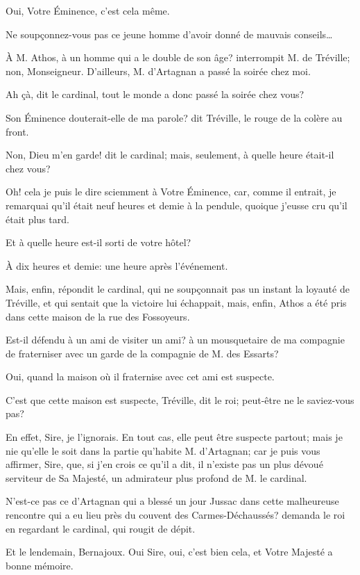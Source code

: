 \speak  Oui, Votre Éminence, c'est cela même. 

\speak  Ne soupçonnez-vous pas ce jeune homme d'avoir donné de mauvais conseils\dots 

\speak  À M. Athos, à un homme qui a le double de son âge? interrompit M. de Tréville; non, Monseigneur. D'ailleurs, M. d'Artagnan a passé la soirée chez moi. 

\speak  Ah çà, dit le cardinal, tout le monde a donc passé la soirée chez vous? 

\speak  Son Éminence douterait-elle de ma parole? dit Tréville, le rouge de la colère au front. 

\speak  Non, Dieu m'en garde! dit le cardinal; mais, seulement, à quelle heure était-il chez vous? 

\speak  Oh! cela je puis le dire sciemment à Votre Éminence, car, comme il entrait, je remarquai qu'il était neuf heures et demie à la pendule, quoique j'eusse cru qu'il était plus tard. 

\speak  Et à quelle heure est-il sorti de votre hôtel? 

\speak  À dix heures et demie: une heure après l'événement. 

\speak  Mais, enfin, répondit le cardinal, qui ne soupçonnait pas un instant la loyauté de Tréville, et qui sentait que la victoire lui échappait, mais, enfin, Athos a été pris dans cette maison de la rue des Fossoyeurs. 

\speak  Est-il défendu à un ami de visiter un ami? à un mousquetaire de ma compagnie de fraterniser avec un garde de la compagnie de M. des Essarts? 

\speak  Oui, quand la maison où il fraternise avec cet ami est suspecte. 

\speak  C'est que cette maison est suspecte, Tréville, dit le roi; peut-être ne le saviez-vous pas? 

\speak  En effet, Sire, je l'ignorais. En tout cas, elle peut être suspecte partout; mais je nie qu'elle le soit dans la partie qu'habite M. d'Artagnan; car je puis vous affirmer, Sire, que, si j'en crois ce qu'il a dit, il n'existe pas un plus dévoué serviteur de Sa Majesté, un admirateur plus profond de M. le cardinal. 

\speak  N'est-ce pas ce d'Artagnan qui a blessé un jour Jussac dans cette malheureuse rencontre qui a eu lieu près du couvent des Carmes-Déchaussés? demanda le roi en regardant le cardinal, qui rougit de dépit. 

\speak  Et le lendemain, Bernajoux. Oui Sire, oui, c'est bien cela, et Votre Majesté a bonne mémoire. 

